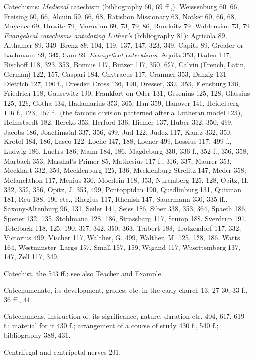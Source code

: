 Catechisms: \emph{Medieval} catechism (bibliography 60, 69 ff.,). Weissenburg 60, 66, Freising 60, 66, Alcuin 59, 66, 68, Ratisbon Missionary 63, Notker 60, 66, 68, Mayence 69; Hussite 79, Moravian 69, 73, 79, 86, Raudnitz 79. Waldensian 73, 79. \emph{Evangelical catechisms antedating Luther’s} (bibliography 81): Agricola 89, Althamer 89, 349, Brenz 89, 104, 119, 137, 147, 323, 349, Capito 89, Greater or Lachmann 89, 349, Sam 89. \emph{Evangelical catechisms}: Aquila 353, Baden 147, Bischoff 118, 323, 353, Bonnus 117, Butzer 117, 350, 627, Calvin (French, Latin, German) 122, 157, Caspari 184, Chytraeus 117, Cranmer 353, Danzig 131, Dietrich 127, 190 f., Dresden Cross 136, 190, Dresser, 332, 353, Flensburg 136, Friedrich 118, Gausewitz 190, Frankfort-on-Oder 131, Gesenius 125, 128, Glassius 125, 129, Gotha 134, Hadamarius 353, 365, Han 359, Hanover 141, Heidelberg 116 f., 123, 157 f., (the famous division patterned after a Lutheran model 123), Helmstaedt 182, Hercko 353, Herford 136, Hiemer 137, Huber 332, 350, 499, Jacobs 186, Joachimstal 337, 356, 499, Jud 122, Judex 117, Kantz 332, 350, Krotel 184, 186, Lasco 122, Loehe 147, 188, Loener 499, Lossius 117, 499 f., Ludwig 186, Luehrs 186, Mann 184, 186, Magdeburg 330, 336 f., 352 f., 356, 358, Marbach 353, Marshal’s Primer 85, Mathesius 117 f., 316, 337, Maurer 353, Meckhart 332, 350, Mecklenburg 125, 136, Mecklenburg-Strelitz 147, Meder 358, Melanchthon 117, Menius 330, Moerlein 118, 353, Nuremberg 125, 128, Opitz, H. 332, 352, 356, Opitz, J. 353, 499, Pontoppidan 190, Quedlinburg 131, Quitman 181, Reu 188, 190 etc., Rhegius 117, Rhenish 147, Sauermann 330, 335 ff., Saxony-Altenburg 96, 131, Seiler 141, Seiss 186, Siber 338, 353, 364, Spaeth 186, Spener 132, 135, Stohlmann 128, 186, Strassburg 117, Stump 188, Sverdrup 191, Tetelbach 118, 125, 190, 337, 342, 350, 363, Trabert 188, Trotzendorf 117, 332, Victorius 499, Vischer 117, Walther, G. 499, Walther, M. 125, 128, 186, Watts 164, Westminster, Large 157, Small 157, 159, Wigand 117, Wuerttemberg 137, 147, Zell 117, 349.

Catechist, the 543 ff.; see also Teacher and Example.

Catechumenate, its development, grades, etc. in the early church 13, 27-30, 33 f., 36 ff., 44.

Catechumens, instruction of: its significance, nature, duration etc. 404, 617, 619 f.; material for it 430 f.; arrangement of a course of study 430 f., 540 f.; bibliography 388, 431.

Centrifugal and centripetal nerves 201.

